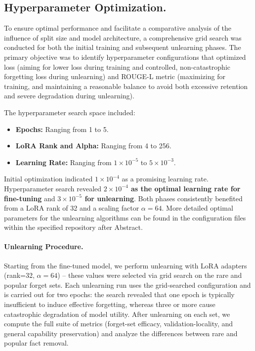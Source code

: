 \documentclass[sigconf,anonymous]{aamas}
\begin{document}
\subsection{Hyperparameter Optimization.}
\label{sec:hyperparameters}

To ensure optimal performance and facilitate a comparative analysis of the influence of split size and model architecture, a comprehensive grid search was conducted for both the initial training and subsequent unlearning phases. The primary objective was to identify hyperparameter configurations that optimized loss (aiming for lower loss during training and controlled, non-catastrophic forgetting loss during unlearning) and ROUGE-L metric (maximizing for training, and maintaining a reasonable balance to avoid both excessive retention and severe degradation during unlearning).

The hyperparameter search space included:
\begin{itemize}
    \item \textbf{Epochs:} Ranging from 1 to 5.
    \item \textbf{LoRA Rank and Alpha:} Ranging from 4 to 256.
    \item \textbf{Learning Rate:} Ranging from $1 \times 10^{-5}$ to $5 \times 10^{-3}$.
\end{itemize}

Initial optimization indicated $1 \times 10^{-4}$ as a promising learning rate. Hyperparameter search revealed \textbf{$2 \times 10^{-4}$ as the optimal learning rate for fine-tuning} and \textbf{$3 \times 10^{-5}$ for unlearning}. Both phases consistently benefited from a LoRA rank of 32 and a scaling factor $\alpha = 64$.
More detailed optimal parameters for the unlearning algorithms can be found in the configuration files within the specified repository after Abstract.


\paragraph{Unlearning Procedure.}
Starting from the fine-tuned model, we perform unlearning with LoRA adapters (rank=32, $\alpha=64$) -- these values were selected via grid search on the rare and popular forget sets. Each unlearning run uses the grid-searched configuration and is carried out for two epochs: the search revealed that one epoch is typically insufficient to induce effective forgetting, whereas three or more cause catastrophic degradation of model utility. After unlearning on each set, we compute the full suite of metrics (forget-set efficacy, validation-locality, and general capability preservation) and analyze the differences between rare and popular fact removal.
\end{document}
